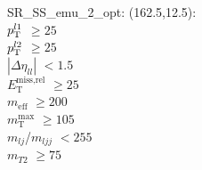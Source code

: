 SR\_SS\_emu\_2\_opt: (162.5,12.5): \\
$p_{\text{T}}^{l1}$ $\geq 25$ \\
$p_{\text{T}}^{l2}$ $\geq 25$ \\
$|\Delta\eta_{ll}|$ $<1.5$ \\
$E_{\text{T}}^{\text{miss,rel}}$ $\geq 25$ \\
$m_{\text{eff}}$ $\geq 200$ \\
$m_{\text{T}}^{\text{max}}$ $\geq 105$ \\
$m_{lj}$/$m_{ljj}$ $<255$ \\
$m_{T2}$ $\geq 75$ \\
